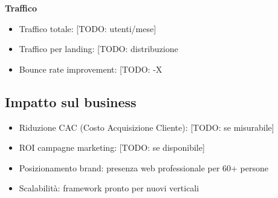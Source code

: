 \textbf{Traffico}
\begin{itemize}
  \item Traffico totale: [TODO: utenti/mese]
  \item Traffico per landing: [TODO: distribuzione %
  \item Bounce rate improvement: [TODO: -X%
\end{itemize}

\subsection{Impatto sul business}
\begin{itemize}
  \item Riduzione CAC (Costo Acquisizione Cliente): [TODO: se misurabile]
  \item ROI campagne marketing: [TODO: se disponibile]
  \item Posizionamento brand: presenza web professionale per 60+ persone
  \item Scalabilità: framework pronto per nuovi verticali
\end{itemize}